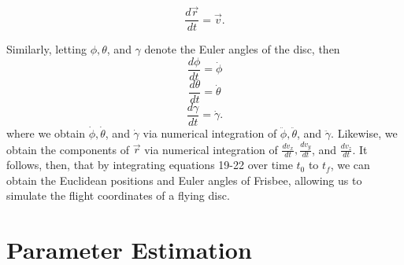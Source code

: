 \documentclass[a4paper,12pt, oneside]{article}
\begin{document}
\begin{equation}
  \label{eq:position_deriv}
  \frac{d\vec{r}}{dt} = \vec{v}.
\end{equation}

Similarly, letting $\phi, \theta$, and $\gamma$ denote the Euler angles of the disc, then
\begin{equation}
\frac{d\phi}{dt}=\dot\phi
\end{equation}
\begin{equation}
\frac{d\theta}{dt}=\dot\theta
\end{equation}
\begin{equation}
\frac{d\gamma}{dt}=\dot\gamma.
\end{equation}
where we obtain $\dot\phi, \dot\theta$, and $\dot\gamma$ via numerical integration of $\ddot\phi, \ddot\theta$, and $\ddot\gamma$. Likewise, we obtain the components of $\vec{r}$ via numerical integration of $\frac{{dv}_x}{dt}, \frac{{dv}_y}{dt}$, and $\frac{{dv}_z}{dt}$. It follows, then, that by integrating equations 19-22 over time $t_0$ to $t_f$, we can obtain the Euclidean positions and Euler angles of Frisbee, allowing us to simulate the flight coordinates of a flying disc. 

\section{Parameter Estimation}
\end{document}
